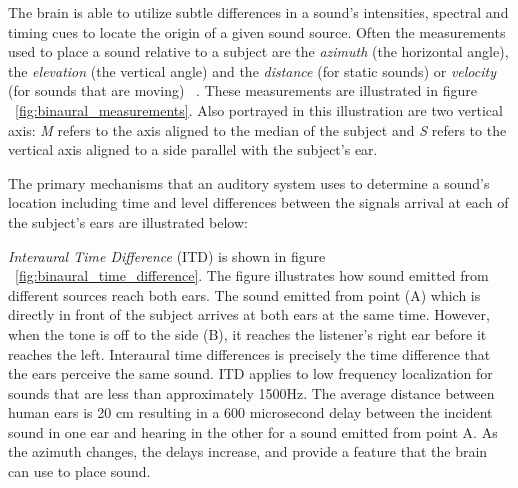 The brain is able to utilize subtle differences in a sound's intensities,
spectral and timing cues to locate the origin of a given sound source. Often
the measurements used to place a sound relative to a subject are the
\textit{azimuth} (the horizontal angle), the \textit{elevation} (the vertical
angle) and the \textit{distance} (for static sounds) or \textit{velocity} (for
sounds that are moving) ~\cite{shannan2010audiology}. These measurements are
illustrated in figure ~\ref{fig:binaural_measurements}. Also portrayed in this
illustration are two vertical axis: \textit{M} refers to the axis aligned to
the median of the subject and \textit{S} refers to the vertical axis aligned to
a side parallel with the subject's ear.

The primary mechanisms that an auditory system uses to determine a sound's
location including time and level differences between the signals arrival at
each of the subject's ears are illustrated below:

\textit{Interaural Time Difference} (ITD) is shown in figure
~\ref{fig:binaural_time_difference}. The figure illustrates how sound emitted
from different sources reach both ears. The sound emitted from point (A) which
is directly in front of the subject arrives at both ears at the same time.
However, when the tone is off to the side (B), it reaches the listener's right ear
before it reaches the left. Interaural time differences is precisely the time
difference that the ears perceive the same sound. ITD applies to low frequency
localization for sounds that are less than approximately 1500Hz. The average
distance between human ears is 20 cm resulting in a 600 microsecond delay between
the incident sound in one ear and hearing in the other for a sound emitted from
point A. As the azimuth changes, the delays increase, and provide a feature
that the brain can use to place sound.


